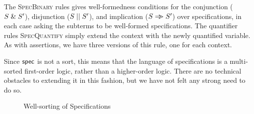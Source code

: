 The \textsc{SpecBinary} rules gives well-formedness conditions for the
conjunction ($S \;\&\; S'$), disjunction ($S \;||\; S'$), and
implication ($S \Rightarrow\!\!\!> S'$) over specifications, in each case asking
the subterms to be well-formed specifications. The quantifier rules
\textsc{SpecQuantify} simply extend the context with the newly
quantified variable. As with assertions, we have three versions of
this rule, one for each context.

Since $\mathsf{spec}$ is not a sort, this means that the language of
specifications is a multi-sorted first-order logic, rather than a
higher-order logic. There are no technical obstacles to extending it
in this fashion, but we have not felt any strong need to do so.


\begin{figure}
\caption{Well-sorting of Specifications}
\label{logic-spec-ok}
\end{figure}

